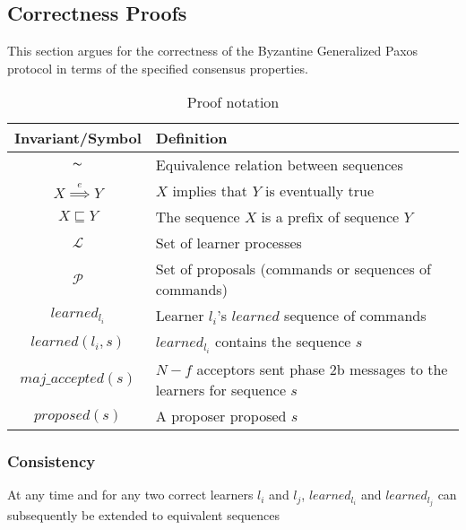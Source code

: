 \subsection{Correctness Proofs}

This section argues for the correctness of the Byzantine Generalized Paxos protocol in terms of the specified consensus properties.\par


\begin{table}[h!]
	\renewcommand{\arraystretch}{1.5}
	\centering
	\begin{tabularx}{\linewidth}{ |c|X|}
		\hline
		Invariant/Symbol & Definition \\
		\hline
		$\thicksim$ & Equivalence relation between sequences \\
		\hline
		$X \overset{e}{\implies} Y$ & $X$ implies that $Y$ is eventually true \\
		\hline
		$X \sqsubseteq Y$ & The sequence $X$ is a prefix of sequence $Y$ \\
		\hline
		$\mathcal{L}$ & Set of learner processes \\
		\hline
		$\mathcal{P}$ & Set of proposals (commands or sequences of commands) \\
		\hline
		$learned_{l_i}$ & Learner $l_i$'s $learned$ sequence of commands \\
		\hline
		$learned(l_i,s)$ & $learned_{l_i}$ contains the sequence $s$ \\
		\hline
		$maj\_accepted(s)$ & $N-f$ acceptors sent phase 2b messages to the learners for sequence $s$ \\
		\hline
		$proposed(s)$ & A proposer proposed $s$ \\
		\hline
		
  	\end{tabularx} 
	\caption{Proof notation} 
	\label{table:1}
\end{table}

\subsubsection{Consistency}
\begin{Theorem}At any time and for any two correct learners $l_i$ and $l_j$, $learned_{l_i}$ and $learned_{l_j}$ can subsequently be extended to equivalent sequences \par
\end{Theorem} 

